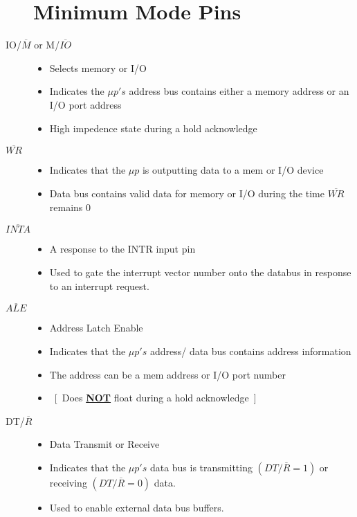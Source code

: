 \begin{description}
\section{Minimum Mode Pins}

  \item[IO/$\overline{M}$ or M/$\overline{IO}$]
  \begin{itemize}
      \item Selects memory or I/O
      \item Indicates the $\mu p's$ address bus contains either a memory address or an I/O
      port address
      \item High impedence state during a hold acknowledge
  \end{itemize}

  \item[$\overline{WR}$]
  \begin{itemize}
      \item Indicates that the $\mu p$ is outputting data to a mem or I/O device
      \item Data bus contains valid data for memory or I/O during the time $\overline{WR}$ remains 0
  \end{itemize}

  \item[$\overline{INTA}$]
  \begin{itemize}
      \item  A response to the INTR input pin
      \item  Used to gate the interrupt vector number onto the databus in response to an interrupt request.
  \end{itemize}

  \item[$\overline{ALE}$]
  \begin{itemize}
      \item  Address Latch Enable
      \item Indicates that the $\mu p's$ address/ data bus contains address information
      \item The address can be a mem address or I/O port number
      \item ~[~Does \textbf{\underline{NOT}} float during a hold acknowledge~]
  \end{itemize}

  \item[DT/$\overline{R}$]
  \begin{itemize}
      \item  Data Transmit or Receive
      \item Indicates that the $\mu p's$ data bus is transmitting $( DT/\overline{R} = 1 )$ or
      receiving $( DT/\overline{R} = 0 )$ data.
      \item Used to enable external data bus buffers.
  \end{itemize}


\end{description}
